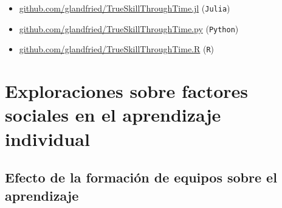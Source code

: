 \documentclass[a4paper,10pt]{book}
\theoremstyle{definition}
\newif\ifen
\newif\ifes
\newcommand{\en}[1]{\ifen#1\fi}
\newcommand{\es}[1]{\ifes#1\fi}
\begin{document}
\en{The source codes for the TrueSkill Through Time packages can be found at:}
\es{Los c\'odigos fuentes de los paquetes TrueSkill Through Time se encuentran en:}
\begin{itemize}
\item \href{github.com/glandfried/TrueSkillThroughTime.jl}{\url{github.com/glandfried/TrueSkillThroughTime.jl}} (\texttt{Julia})
\item \href{github.com/glandfried/TrueSkillThroughTime.py}{\url{github.com/glandfried/TrueSkillThroughTime.py}}  (\texttt{Python})
\item \href{github.com/glandfried/TrueSkillThroughTime.R}{\url{github.com/glandfried/TrueSkillThroughTime.R}}  (\texttt{R})
\end{itemize}





























\chapter{Exploraciones sobre factores sociales en el aprendizaje individual}


\section{Efecto de la formaci\'on de equipos sobre el aprendizaje} \label{ch:team}
\end{document}
